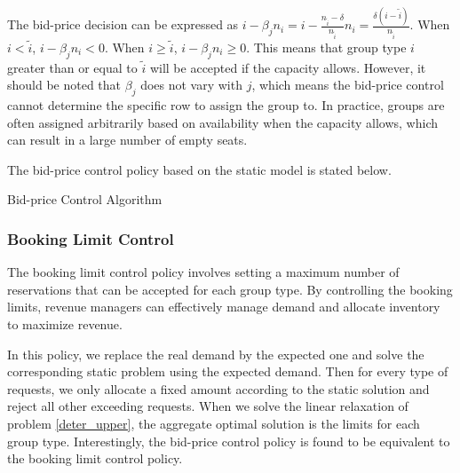 The bid-price decision can be expressed as $i - \beta_j n_i = i - \frac{n_{\tilde{i}} - \delta}{n_{\tilde{i}}} n_i = \frac{\delta (i - \tilde{i})}{n_{\tilde{i}}}$. When $i < \tilde{i}$, $i - \beta_j n_i < 0$. When $i \geq \tilde{i}$, $i - \beta_j n_i \geq 0$. This means that group type $i$ greater than or equal to $\tilde{i}$ will be accepted if the capacity allows. However, it should be noted that $\beta_j$ does not vary with $j$, which means the bid-price control cannot determine the specific row to assign the group to. In practice, groups are often assigned arbitrarily based on availability when the capacity allows, which can result in a large number of empty seats.

The bid-price control policy based on the static model is stated below.

\begin{algorithm}[H]
  \caption{Bid-price Control Algorithm}\label{algo_bid}
\end{algorithm}


\subsubsection*{Booking Limit Control}

The booking limit control policy involves setting a maximum number of reservations that can be accepted for each group type. By controlling the booking limits, revenue managers can effectively manage demand and allocate inventory to maximize revenue.

In this policy, we replace the real demand by the expected one and solve the corresponding static problem using the expected demand. Then for every type of requests, we only allocate a fixed amount according to the static solution and reject all other exceeding requests. When we solve the linear relaxation of problem \eqref{deter_upper}, the aggregate optimal solution is the limits for each group type. Interestingly, the bid-price control policy is found to be equivalent to the booking limit control policy.

